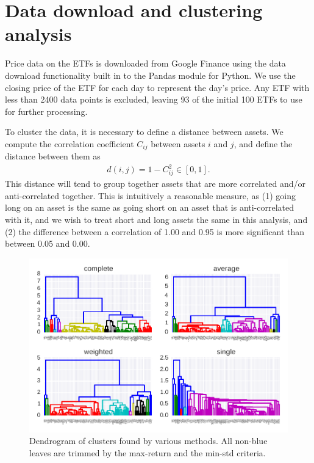 \section{Data download and clustering analysis}

Price data on the ETFs is downloaded from Google Finance using the data download functionality built in to the Pandas module for Python.
We use the closing price of the ETF for each day to represent the day's price.
Any ETF with less than 2400 data points is excluded, leaving 93 of the initial 100 ETFs to use for further processing.

To cluster the data, it is necessary to define a distance between assets. We compute the correlation coefficient $C_{ij}$ between assets $i$ and $j$, and define the distance between them as
\begin{gather}
d(i,j) = 1 - C_{ij}^2  \in [0, 1].
\end{gather}
This distance will tend to group together assets that are more correlated and/or anti-correlated together.
This is intuitively a reasonable measure, as (1) going long on an asset is the same as going short on an asset that is anti-correlated with it, and we wish to treat short and long assets the same in this analysis, and (2) the difference between a correlation of 1.00 and 0.95 is more significant than between 0.05 and 0.00.

\begin{figure}[tp]
\centering
\includegraphics{../pic/dendro_methods.pdf}
\caption{Dendrogram of clusters found by various methods. All non-blue leaves are trimmed by the max-return and the min-std criteria.}
\label{fig:dendrogram}
\end{figure}

